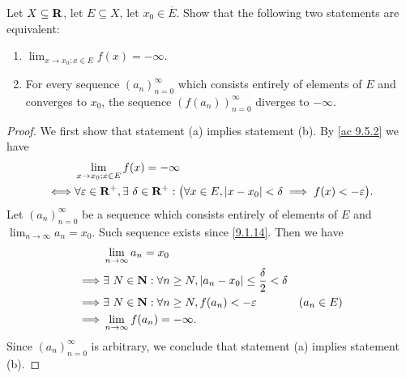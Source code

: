 \begin{additional corollary}\label{ac 9.5.4}
Let \(X \subseteq \mathbf{R}\), let \(E \subseteq X\), let \(x_0 \in \overline{E}\).
Show that the following two statements are equivalent:
\begin{enumerate}
  \item \(\lim_{x \to x_0 ; x \in E} f(x) = -\infty\).
  \item For every sequence \((a_n)_{n = 0}^\infty\) which consists entirely of elements of \(E\) and converges to \(x_0\), the sequence \((f(a_n))_{n = 0}^\infty\) diverges to \(-\infty\).
\end{enumerate}
\end{additional corollary}

\begin{proof}
  We first show that statement (a) implies statement (b).
  By \cref{ac 9.5.2} we have
  \begin{align*}
         & \lim_{x \to x_0 ; x \in E} f(x) = -\infty                                                                                                \\
    \iff & \forall \varepsilon \in \mathbf{R}^+, \exists\ \delta \in \mathbf{R}^+ : \big(\forall x \in E, \left\lvert x - x_0\right\rvert < \delta \implies f(x) < -\varepsilon\big).
  \end{align*}
  Let \((a_n)_{n = 0}^\infty\) be a sequence which consists entirely of elements of \(E\) and \(\lim_{n \to \infty} a_n = x_0\).
  Such sequence exists since \cref{9.1.14}.
  Then we have
  \begin{align*}
             & \lim_{n \to \infty} a_n = x_0                                                                      \\
    \implies & \exists\ N \in \mathbf{N} : \forall n \geq N, \left\lvert a_n - x_0\right\rvert \leq \frac{\delta}{2} < \delta               \\
    \implies & \exists\ N \in \mathbf{N} : \forall n \geq N, f(a_n) < -\varepsilon                          & (a_n \in E) \\
    \implies & \lim_{n \to \infty} f(a_n) = -\infty.
  \end{align*}
  Since \((a_n)_{n = 0}^\infty\) is arbitrary, we conclude that statement (a) implies statement (b).


\end{proof}
